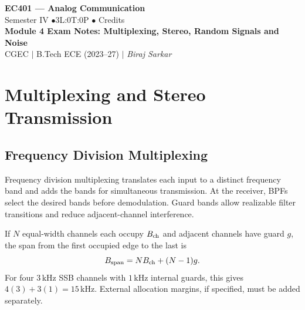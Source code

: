 \documentclass[12pt,a4paper]{article}
\begin{document}
\begin{center}
  {\LARGE\bfseries\color{myred} EC401 --- Analog Communication}\\[5pt]
  {\normalsize\color{mydark} Semester IV \quad$\bullet$\quad 3L:0T:0P \quad$\bullet$ Credits}\\[3pt]
  {\normalsize\color{myteal}\textbf{Module 4 Exam Notes: Multiplexing, Stereo, Random Signals and Noise}}\\[3pt]
  {\small\color{mydark} CGEC \;$|$\; B.Tech ECE (2023--27) \;$|$\; \textit{Biraj Sarkar}}
\end{center}
\vspace{2pt}
\noindent{\color{myred}\rule{\linewidth}{1.5pt}}
\vspace{2pt}

\hypersetup{linkcolor=mydark}
\tableofcontents
\hypersetup{linkcolor=myteal}
\newpage

\section{Multiplexing and Stereo Transmission}
\subsection{Frequency Division Multiplexing}
\begin{tcolorbox}[defbox, title={FDM}]
Frequency division multiplexing translates each input to a distinct frequency band and adds the bands for simultaneous transmission. At the receiver, BPFs select the desired bands before demodulation. Guard bands allow realizable filter transitions and reduce adjacent-channel interference.
\end{tcolorbox}
If $N$ equal-width channels each occupy $B_{\rm ch}$ and adjacent channels have guard $g$, the span from the first occupied edge to the last is
\[
 B_{\rm span}=NB_{\rm ch}+(N-1)g.
\]
For four $3\,\mathrm{kHz}$ SSB channels with $1\,\mathrm{kHz}$ internal guards, this gives $4(3)+3(1)=15\,\mathrm{kHz}$. External allocation margins, if specified, must be added separately.

\begin{tcolorbox}[tikzbox, unbreakable, title={FDM Channels and Guard Bands}]
\centering
{}\par
\end{tcolorbox}
\end{document}

